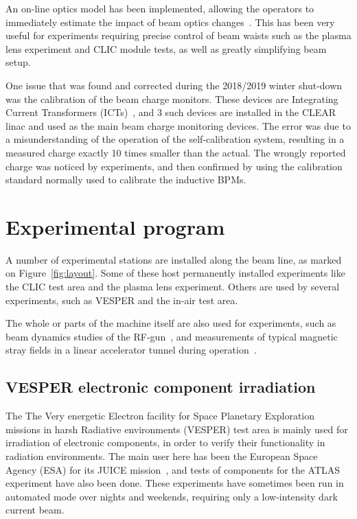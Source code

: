 \documentclass[a4paper,
               keeplastbox,   %
               ]{jacow}
\begin{document}

An on-line optics model has been implemented, allowing the operators to immediately estimate the impact of beam optics changes~\cite{Erik::CLEARrev}.
This has been very useful for experiments requiring precise control of beam waists such as the plasma lens experiment and CLIC module tests, as well as greatly simplifying beam setup.

One issue that was found and corrected during the  2018/2019 winter shut-down was the calibration of the beam charge monitors.
These devices are Integrating Current Transformers (ICTs)~\cite{BergozICT}, and 3 such devices are installed in the CLEAR linac and used as the main beam charge monitoring devices.
The error was due to a misunderstanding of the operation of the self-calibration system, resulting in a measured charge exactly 10 times smaller than the actual.
The wrongly reported charge was noticed by experiments, and then confirmed by using the calibration standard normally used to calibrate the inductive BPMs.

\section{Experimental program}
A number of experimental stations are installed along the beam line, as marked on Figure~\ref{fig:layout}.
Some of these host permanently installed experiments like the CLIC test area and the plasma lens experiment.
Others are used by several experiments, such as VESPER and the in-air test area.

The whole or parts of the machine itself are also used for experiments, such as beam dynamics studies of the RF-gun~\cite{LucaGun}, and measurements of typical magnetic stray fields in a linear accelerator tunnel during operation~\cite{Gohil:IPAC19-MOPGW081}.

\subsection{VESPER electronic component irradiation}
The The Very energetic Electron facility for Space Planetary Exploration missions in harsh Radiative environments (VESPER) test area is mainly used for irradiation of electronic components, in order to verify their functionality in radiation environments.
The main user here has been the European Space Agency (ESA) for its JUICE mission~\cite{MarisTali:E-SEU,MarisTali:E-SEL,RubenAlia::CLEARrev}, and tests of components for the ATLAS experiment have also been done.
These experiments have sometimes been run in automated mode over nights and weekends, requiring only a low-intensity dark current beam.
\end{document}

